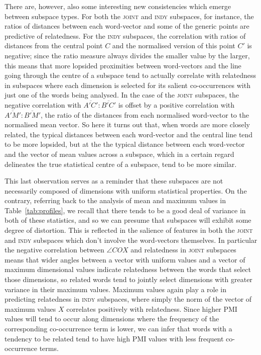 There are, however, also some interesting new consistencies which emerge between subspace types.  For both the \textsc{joint} and \textsc{indy} subspaces, for instance, the ratios of distances between each word-vector and some of the generic points are predictive of relatedness.  For the \textsc{indy} subspaces, the correlation with ratios of distances from the central point $C$ and the normalised version of this point $C'$ is negative; since the ratio measure always divides the smaller value by the larger, this means that more lopsided proximities between word-vectors and the line going through the centre of a subspace tend to actually correlate with relatedness in subspaces where each dimension is selected for its salient co-occurrences with just one of the words being analysed.  In the case of the \textsc{joint} subspaces, the negative correlation with $\overline{A'C'}:\overline{B'C'}$ is offset by a positive correlation with $\overline{A'M'}:\overline{B'M'}$, the ratio of the distances from each normalised word-vector to the normalised mean vector.  So here it turns out that, when words are more closely related, the typical distances between each word-vector and the central line tend to be more lopsided, but at the the typical distance between each word-vector and the vector of mean values across a subspace, which in a certain regard delineates the true statistical centre of a subspace, tend to be more similar.

This last observation serves as a reminder that these subspaces are not necessarily composed of dimensions with uniform statistical properties.  On the contrary, referring back to the analysis of mean and maximum values in Table~\ref{tab:profiles}, we recall that there tends to be a good deal of variance in both of these statistics, and so we can presume that subspaces will exhibit some degree of distortion.  This is reflected in the salience of features in both the \textsc{joint} and \textsc{indy} subspaces which don't involve the word-vectors themselves.  In particular the negative correlation between $\angle COX$ and relatedness in \textsc{joint} subspaces means that wider angles between a vector with uniform values and a vector of maximum dimensional values indicate relatedness between the words that select those dimensions, so related words tend to jointly select dimensions with greater variance in their maximum values.  Maximum values again play a role in predicting relatedness in \textsc{indy} subspaces, where simply the norm of the vector of maximum values $X$ correlates positively with relatedness.  Since higher PMI values will tend to occur along dimensions where the frequency of the corresponding co-occurrence term is lower, we can infer that words with a tendency to be related tend to have high PMI values with less frequent co-occurrence terms.

